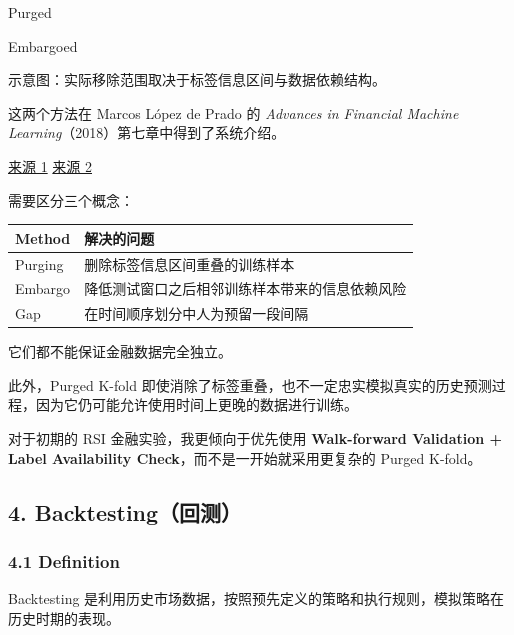 Purged

Embargoed

示意图：实际移除范围取决于标签信息区间与数据依赖结构。

这两个方法在 Marcos López de Prado 的 \emph{Advances in Financial Machine Learning}（2018）第七章中得到了系统介绍。

\href{https://www.wiley.com/en-us/Advances\%2Bin\%2BFinancial\%2BMachine\%2BLearning-p-9781119482086}{来源 1} \href{https://studylib.net/doc/28617353/advances-in-financial-machine-learning-1nbsped-9781119482...}{来源 2}

需要区分三个概念：

\begin{readertable}
\begin{longtable}[]{@{}
  >{\raggedright\arraybackslash}p{}
  >{\raggedright\arraybackslash}p{}@{}}
\toprule
Method & 解决的问题 \\
\midrule
\endhead
Purging & 删除标签信息区间重叠的训练样本 \\
Embargo & 降低测试窗口之后相邻训练样本带来的信息依赖风险 \\
Gap & 在时间顺序划分中人为预留一段间隔 \\
\bottomrule
\end{longtable}
\end{readertable}

它们都不能保证金融数据完全独立。

此外，Purged K-fold 即使消除了标签重叠，也不一定忠实模拟真实的历史预测过程，因为它仍可能允许使用时间上更晚的数据进行训练。

对于初期的 RSI 金融实验，我更倾向于优先使用 \textbf{Walk-forward Validation + Label Availability Check}，而不是一开始就采用更复杂的 Purged K-fold。

\hypertarget{part-2-27-0001-backtestingux56deux6d4b}{%
\subsection{4. Backtesting（回测）}\label{part-2-27-0001-backtestingux56deux6d4b}}

\hypertarget{part-2-27-0001-definition}{%
\subsubsection{4.1 Definition}\label{part-2-27-0001-definition}}

Backtesting 是利用历史市场数据，按照预先定义的策略和执行规则，模拟策略在历史时期的表现。

